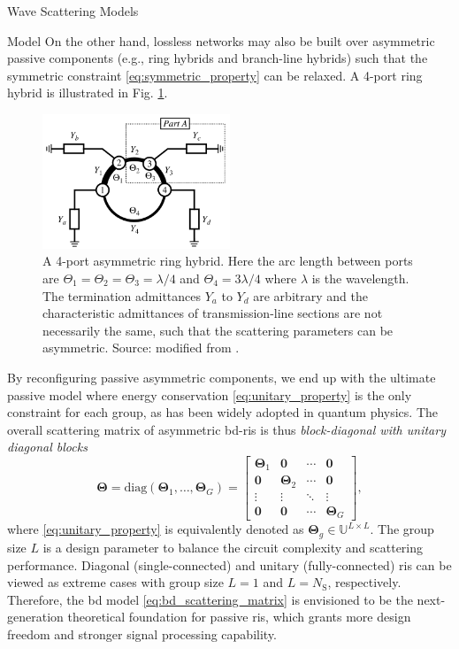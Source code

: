 \begin{section}{}
\begin{subsection}{Wave Scattering Models}
\begin{subsubsection}{ Model}
			On the other hand, lossless networks may also be built over asymmetric passive components (e.g., ring hybrids and branch-line hybrids) such that the symmetric constraint \eqref{eq:symmetric_property} can be relaxed.
			A 4-port ring hybrid is illustrated in Fig. \ref{fg:ring_hybrid}.
			\begin{figure}[H]
				\centering
				\includegraphics[width=0.5\textwidth]{assets/chapter_2/ring_hybrid.pdf}
				\caption{A 4-port asymmetric ring hybrid. Here the arc length between ports are $\Theta_1 = \Theta_2 = \Theta_3 = \lambda / 4$ and $\Theta_4 = 3 \lambda / 4$ where $\lambda$ is the wavelength. The termination admittances $Y_a$ to $Y_d$ are arbitrary and the characteristic admittances of transmission-line sections are not necessarily the same, such that the scattering parameters can be asymmetric. Source: modified from \cite{Ahn2006}.}
				\label{fg:ring_hybrid}
			\end{figure}

			By reconfiguring passive asymmetric components, we end up with the ultimate passive model where energy conservation \eqref{eq:unitary_property} is the only constraint for each group, as has been widely adopted in quantum physics.
			The overall scattering matrix of asymmetric \gls{bd}-\gls{ris} is thus \emph{block-diagonal with unitary diagonal blocks}
			\begin{equation}
				\mathbf{\Theta} = \mathrm{diag}(\mathbf{\Theta}_1,\ldots,\mathbf{\Theta}_G) =
				\begin{bmatrix}
					\mathbf{\Theta}_1 & \mathbf{0} & \cdots & \mathbf{0} \\
					\mathbf{0} & \mathbf{\Theta}_2 & \cdots & \mathbf{0} \\
					\vdots & \vdots & \ddots & \vdots \\
					\mathbf{0} & \mathbf{0} & \cdots & \mathbf{\Theta}_G
				\end{bmatrix},
				\label{eq:bd_scattering_matrix}
			\end{equation}
			where \eqref{eq:unitary_property} is equivalently denoted as $\mathbf{\Theta}_g \in \mathbb{U}^{L \times L}$.
			The group size $L$ is a design parameter to balance the circuit complexity and scattering performance.
			Diagonal (single-connected) and unitary (fully-connected) \gls{ris} can be viewed as extreme cases with group size $L=1$ and $L=N_\mathrm{S}$, respectively.
			Therefore, the \gls{bd} model \eqref{eq:bd_scattering_matrix} is envisioned to be the next-generation theoretical foundation for passive \gls{ris}, which grants more design freedom and stronger signal processing capability.


\end{subsubsection}
\end{subsection}
\end{section}

